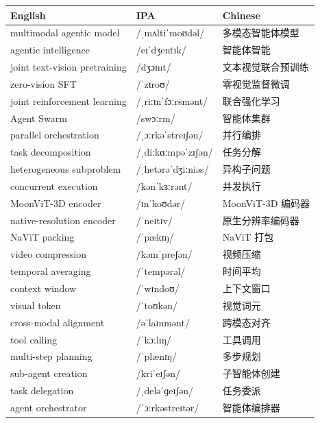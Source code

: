 \documentclass[UTF8,12pt,a4paper]{ctexart}
\providecommand{\zh}[1]{#1}
\begin{document}
\begin{tabular*}{\textwidth}{@{\extracolsep{\fill}}lll@{}}
\toprule
\textbf{English} & \textbf{IPA} & \textbf{Chinese} \\
\midrule
multimodal agentic model & {\ipafont /ˌmʌltiˈmoʊdəl/} & \zh{多模态智能体模型} \\
agentic intelligence & {\ipafont /eɪˈdʒentɪk/} & \zh{智能体智能} \\
joint text-vision pretraining & {\ipafont /dʒɔɪnt/} & \zh{文本视觉联合预训练} \\
zero-vision SFT & {\ipafont /ˈzɪroʊ/} & \zh{零视觉监督微调} \\
joint reinforcement learning & {\ipafont /ˌriːɪnˈfɔːrsmənt/} & \zh{联合强化学习} \\
Agent Swarm & {\ipafont /swɔːrm/} & \zh{智能体集群} \\
parallel orchestration & {\ipafont /ˌɔːrkəˈstreɪʃən/} & \zh{并行编排} \\
task decomposition & {\ipafont /ˌdiːkɑːmpəˈzɪʃən/} & \zh{任务分解} \\
heterogeneous subproblem & {\ipafont /ˌhetərəˈdʒiːniəs/} & \zh{异构子问题} \\
concurrent execution & {\ipafont /kənˈkɜːrənt/} & \zh{并发执行} \\
MoonViT-3D encoder & {\ipafont /ɪnˈkoʊdər/} & \zh{MoonViT-3D 编码器} \\
native-resolution encoder & {\ipafont /ˈneɪtɪv/} & \zh{原生分辨率编码器} \\
NaViT packing & {\ipafont /ˈpækɪŋ/} & \zh{NaViT 打包} \\
video compression & {\ipafont /kəmˈpreʃən/} & \zh{视频压缩} \\
temporal averaging & {\ipafont /ˈtempərəl/} & \zh{时间平均} \\
context window & {\ipafont /ˈwɪndoʊ/} & \zh{上下文窗口} \\
visual token & {\ipafont /ˈtoʊkən/} & \zh{视觉词元} \\
cross-modal alignment & {\ipafont /əˈlaɪnmənt/} & \zh{跨模态对齐} \\
tool calling & {\ipafont /ˈkɔːlɪŋ/} & \zh{工具调用} \\
multi-step planning & {\ipafont /ˈplænɪŋ/} & \zh{多步规划} \\
sub-agent creation & {\ipafont /kriˈeɪʃən/} & \zh{子智能体创建} \\
task delegation & {\ipafont /ˌdeləˈɡeɪʃən/} & \zh{任务委派} \\
agent orchestrator & {\ipafont /ˈɔːrkəstreɪtər/} & \zh{智能体编排器} \\

\end{tabular*}
\end{document}
